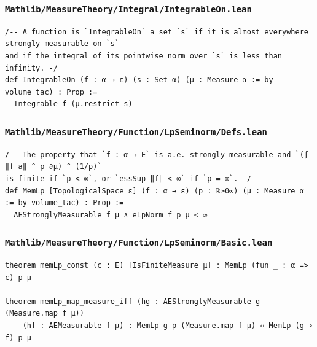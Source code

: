 \subsubsection{\texttt{Mathlib/MeasureTheory/Integral/IntegrableOn.lean}}
\begin{lstlisting}[language=lean]
/-- A function is `IntegrableOn` a set `s` if it is almost everywhere strongly measurable on `s`
and if the integral of its pointwise norm over `s` is less than infinity. -/
def IntegrableOn (f : α → ε) (s : Set α) (μ : Measure α := by volume_tac) : Prop :=
  Integrable f (μ.restrict s)
\end{lstlisting}

\newpage
\subsubsection{\texttt{Mathlib/MeasureTheory/Function/LpSeminorm/Defs.lean}}
\begin{lstlisting}[language=lean]
/-- The property that `f : α → E` is a.e. strongly measurable and `(∫ ‖f a‖ ^ p ∂μ) ^ (1/p)`
is finite if `p < ∞`, or `essSup ‖f‖ < ∞` if `p = ∞`. -/
def MemLp [TopologicalSpace ε] (f : α → ε) (p : ℝ≥0∞) (μ : Measure α := by volume_tac) : Prop :=
  AEStronglyMeasurable f μ ∧ eLpNorm f p μ < ∞
\end{lstlisting}

\subsubsection{\texttt{Mathlib/MeasureTheory/Function/LpSeminorm/Basic.lean}}
\begin{lstlisting}[language=lean]
theorem memLp_const (c : E) [IsFiniteMeasure μ] : MemLp (fun _ : α => c) p μ

theorem memLp_map_measure_iff (hg : AEStronglyMeasurable g (Measure.map f μ))
    (hf : AEMeasurable f μ) : MemLp g p (Measure.map f μ) ↔ MemLp (g ∘ f) p μ
\end{lstlisting}

